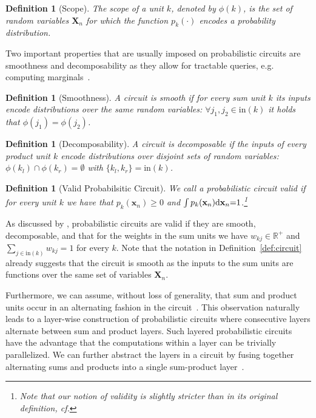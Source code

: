 \documentclass[letterpaper]{article} %
\newcommand{\cf}{cf.\xspace}
\newcommand{\eg}{e.g.\xspace}
\newtheorem{definition}[theorem]{Definition}
\newcommand{\circuit}{\ensuremath{p}}
\newcommand{\inputs}{\ensuremath{\text{in}}}
\newcommand{\Xvars}{\ensuremath{\mathbf{X}}}
\newcommand{\xvars}{\ensuremath{\mathbf{x}}}
\newcommand{\weight}{\ensuremath{w}}
\newcommand{\scope}{\ensuremath{\phi}}
\begin{document}
\begin{definition}[Scope]
	\label{def:scope:cond}
	The scope of a unit $k$, denoted by $\scope(k)$, is the set of random variables $\Xvars_n$ for which the function $\circuit_k (\cdot)$ encodes a probability distribution.
\end{definition}

Two important properties that are usually imposed on probabilistic circuits are smoothness and decomposability as they allow for tractable queries, \eg computing marginals~\citep{darwiche2001decomposable,darwiche2003differential}.
\begin{definition}[Smoothness]
	A circuit is smooth if for every sum unit $k$ its inputs encode distributions over the same random variables:
	$\forall j_1, j_2 {\in} \inputs(k)$ it holds that $\scope(j_1){=}\scope(j_2) $.
\end{definition}

\begin{definition}[Decomposability]
	A circuit is decomposable if the inputs of every product unit
	$k$ encode distributions over disjoint sets of random variables:
	$\scope (k_l) \cap \scope (k_r) = \emptyset$ with $\{k_l, k_r\}= \inputs (k)$.
\end{definition}


\begin{definition}[Valid Probabilsitic Circuit]
	We call a probabilistic circuit valid if for every unit $k$ we have that $p_k(\xvars_n){\geq} 0$ and $\int p_k(\xvars_n) \differential \xvars_n{=}1$.\footnote{Note that our notion of validity is slightly stricter than in its original definition, \cf \citep{poon2011sum}}
\end{definition}

As discussed by \citet{peharz2015theoretical}, probabilistic circuits are valid if they are smooth, decomposable, and that for the weights in the sum units we have $\weight_{kj} \in \mathbb{R}^+$ and $\sum_{j\in\inputs(k)} \weight_{kj} = 1$ for every $k$. Note that the notation in Definition~\ref{def:circuit} already suggests that the circuit is smooth as the inputs to the sum units are functions over the same set of variables $\Xvars_n$.

Furthermore, we can assume, without loss of generality, that sum and product units occur in an alternating fashion in the circuit~\citep{peharz2020einsum}.
This observation naturally leads to a layer-wise construction of probabilistic circuits where consecutive layers alternate between sum and product layers.
Such layered probabilistic circuits~\citep{peharz2019random} have the advantage that the computations within a layer can be trivially parallelized.
We can further abstract the layers in a circuit by fusing together alternating sums and products into a single sum-product layer~\citep{peharz2020einsum}.
\end{document}
